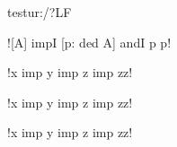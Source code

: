 \documentclass{article}
\begin{document}

\begin{mmttheory}{test}{ur:/?LF}


![A] impI [p: ded A] andI p p!

\begin{mmtcontext}


\begin{mmtcontext}
!x imp y imp z imp zz!
\end{mmtcontext}

!x imp y imp z imp zz!

\end{mmtcontext}
!x imp y imp z imp zz!

\end{mmttheory}
\end{document}
